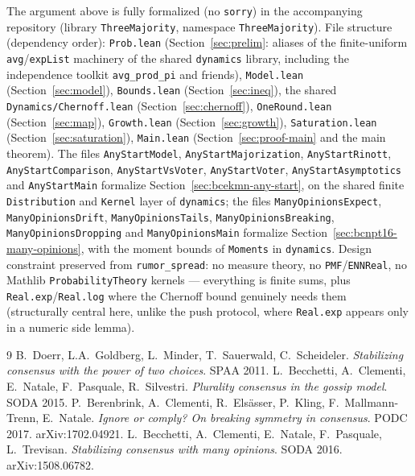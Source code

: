 The argument above is fully formalized (no \texttt{sorry}) in the
accompanying repository (library \texttt{ThreeMajority}, namespace
\texttt{ThreeMajority}). File structure (dependency order):
\texttt{Prob.lean} (Section~\ref{sec:prelim}: aliases of the finite-uniform
\texttt{avg}/\texttt{expList} machinery of the shared \texttt{dynamics}
library, including the independence toolkit \texttt{avg\_prod\_pi} and
friends), \texttt{Model.lean}
(Section~\ref{sec:model}), \texttt{Bounds.lean} (Section~\ref{sec:ineq}),
the shared \texttt{Dynamics/Chernoff.lean} (Section~\ref{sec:chernoff}),
\texttt{OneRound.lean}
(Section~\ref{sec:map}), \texttt{Growth.lean} (Section~\ref{sec:growth}),
\texttt{Saturation.lean} (Section~\ref{sec:saturation}), \texttt{Main.lean}
(Section~\ref{sec:proof-main} and the main theorem). The files
\texttt{AnyStartModel}, \texttt{AnyStartMajorization}, \texttt{AnyStartRinott},
\texttt{AnyStartComparison}, \texttt{AnyStartVsVoter}, \texttt{AnyStartVoter},
\texttt{AnyStartAsymptotics} and \texttt{AnyStartMain} formalize
Section~\ref{sec:bcekmn-any-start}, on the shared finite \texttt{Distribution} and
\texttt{Kernel} layer of \texttt{dynamics}; the files \texttt{ManyOpinionsExpect},
\texttt{ManyOpinionsDrift}, \texttt{ManyOpinionsTails},
\texttt{ManyOpinionsBreaking}, \texttt{ManyOpinionsDropping} and \texttt{ManyOpinionsMain}
formalize Section~\ref{sec:bcnpt16-many-opinions}, with the moment bounds of
\texttt{Moments} in \texttt{dynamics}. Design constraint
preserved from \texttt{rumor\_spread}: no measure theory, no
\texttt{PMF}/\texttt{ENNReal}, no Mathlib \texttt{ProbabilityTheory}
kernels --- everything is finite sums, plus \texttt{Real.exp}/\texttt{Real.log}
where the Chernoff bound genuinely needs them (structurally central here,
unlike the push protocol, where \texttt{Real.exp} appears only in a numeric
side lemma).

\begin{thebibliography}{9}
 B.~Doerr, L.A.~Goldberg, L.~Minder, T.~Sauerwald,
C.~Scheideler. \emph{Stabilizing consensus with the power of two choices}.
SPAA 2011.
 L.~Becchetti, A.~Clementi, E.~Natale, F.~Pasquale,
R.~Silvestri. \emph{Plurality consensus in the gossip model}. SODA 2015.
 P.~Berenbrink, A.~Clementi, R.~Elsässer, P.~Kling,
F.~Mallmann-Trenn, E.~Natale. \emph{Ignore or comply? On breaking symmetry in consensus}.
PODC 2017. arXiv:1702.04921.
 L.~Becchetti, A.~Clementi, E.~Natale, F.~Pasquale, L.~Trevisan.
\emph{Stabilizing consensus with many opinions}. SODA 2016. arXiv:1508.06782.
\end{thebibliography}
